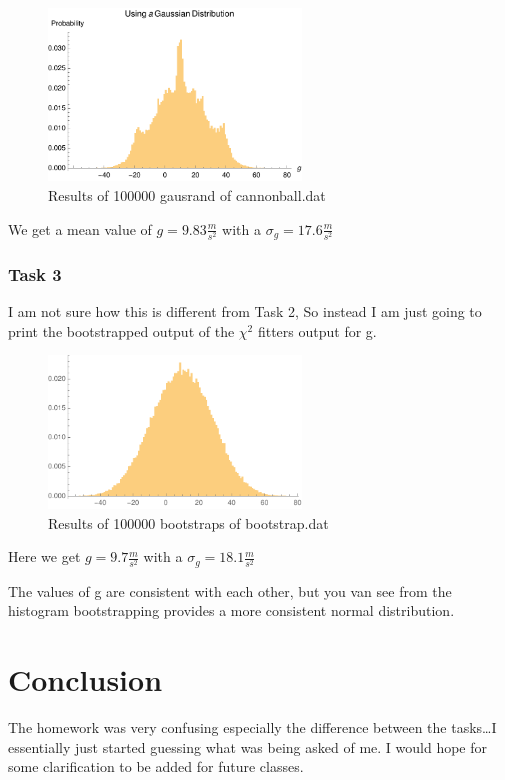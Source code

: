 \documentclass{article}
\begin{document}
\begin{figure}[!htb]
	\begin{center}
		\includegraphics[width=0.6\textwidth]{p4t2a.pdf}
	\end{center}
	\caption{Results of 100000 gausrand of cannonball.dat}
\label{fig:qual}
\end{figure}
\FloatBarrier

We get a mean value of $g=9.83 \frac{m}{s^2}$ with a $\sigma_g = 17.6 \frac{m}{s^2}$ 

\subsubsection{Task 3}

I am not sure how this is different from Task 2, So instead I am just going to print the bootstrapped output of the $\chi^2$ fitters output for g. 


\begin{figure}[!htb]
	\begin{center}
		\includegraphics[width=0.6\textwidth]{p4t3a.pdf}
	\end{center}
	\caption{Results of 100000 bootstraps of bootstrap.dat}
\label{fig:qual}
\end{figure}
\FloatBarrier

Here we get $ g= 9.7 \frac{m}{s^2}$ with a $\sigma_g = 18.1 \frac{m}{s^2}$

The values of g are consistent with each other, but you van see from the histogram bootstrapping provides a more consistent normal distribution.


\section{Conclusion}

The homework was very confusing especially the difference between the tasks\ldots I essentially just started guessing what was being asked of me. I would hope for some clarification to be added for future classes.
\end{document}
